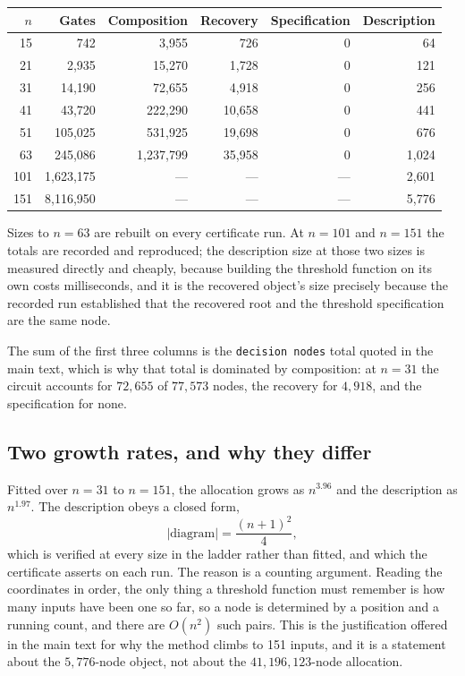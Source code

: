 \documentclass[11pt,a4paper]{article}
\begin{document}
\begin{center}
\begin{tabular}{rrrrrr}
\toprule
$n$ & Gates & Composition & Recovery & Specification & Description\\\midrule
15 & 742 & 3{,}955 & 726 & 0 & 64\\
21 & 2{,}935 & 15{,}270 & 1{,}728 & 0 & 121\\
31 & 14{,}190 & 72{,}655 & 4{,}918 & 0 & 256\\
41 & 43{,}720 & 222{,}290 & 10{,}658 & 0 & 441\\
51 & 105{,}025 & 531{,}925 & 19{,}698 & 0 & 676\\
63 & 245{,}086 & 1{,}237{,}799 & 35{,}958 & 0 & 1{,}024\\
101 & 1{,}623{,}175 & --- & --- & --- & 2{,}601\\
151 & 8{,}116{,}950 & --- & --- & --- & 5{,}776\\
\bottomrule
\end{tabular}
\end{center}

Sizes to $n=63$ are rebuilt on every certificate run. At $n=101$ and $n=151$
the totals are recorded and reproduced; the description
size at those two sizes is measured directly and cheaply, because building the
threshold function on its own costs milliseconds, and it is the recovered
object's size precisely because the recorded run established that the recovered
root and the threshold specification are the same node.

The sum of the first three columns is the \texttt{decision nodes} total quoted
in the main text, which is why that total is dominated by composition: at
$n=31$ the circuit accounts for $72{,}655$ of $77{,}573$ nodes, the recovery for
$4{,}918$, and the specification for none.

\subsection{Two growth rates, and why they differ}

Fitted over $n=31$ to $n=151$, the allocation grows as $n^{3.96}$ and the
description as $n^{1.97}$. The description obeys a closed form,
\begin{equation}
  \lvert\text{diagram}\rvert=\frac{(n+1)^2}{4},
\end{equation}
which is verified at every size in the ladder rather than fitted, and which the
certificate asserts on each run. The reason is a counting argument. Reading the
coordinates in order, the only thing a threshold function must remember is how
many inputs have been one so far, so a node is determined by a position and a
running count, and there are $O(n^2)$ such pairs. This is the justification
offered in the main text for why the method climbs to 151 inputs, and it is a
statement about the $5{,}776$-node object, not about the $41{,}196{,}123$-node
allocation.
\end{document}
